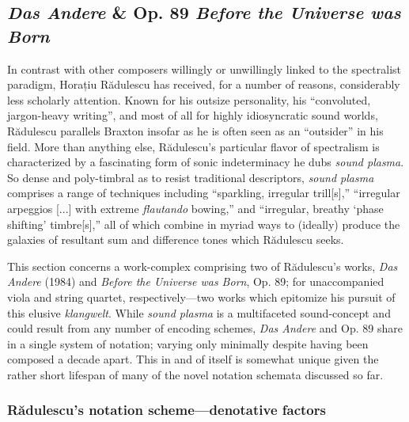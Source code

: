 \subsection{\textit{Das Andere} \& Op. 89 \textit{Before the Universe was Born}}

        In contrast with other composers willingly or unwillingly linked to the spectralist paradigm, Horațiu Rădulescu has received, for a number of reasons, considerably less scholarly attention. Known for his outsize personality, his ``convoluted, jargon-heavy writing'', and most of all for highly idiosyncratic sound worlds, Rădulescu parallels Braxton insofar as he is often seen as an ``outsider'' in his field.\autocite{Suckling_2018} More than anything else, Rădulescu's particular flavor of spectralism is characterized by a fascinating form of sonic indeterminacy he dubs \textit{sound plasma}. So dense and poly-timbral as to resist traditional descriptors, \textit{sound plasma} comprises a range of techniques including ``sparkling, irregular trill[s],'' ``irregular arpeggios [...] with extreme \textit{flautando} bowing,'' and ``irregular, breathy `phase shifting' timbre[s],'' all of which combine in myriad ways to (ideally) produce the galaxies of resultant sum and difference tones which Rădulescu seeks.\autocite{Heery_2016}
        
        This section concerns a work-complex comprising two of Rădulescu's works, \textit{Das Andere} (1984) and \textit{Before the Universe was Born}, Op. 89; for unaccompanied viola and string quartet, respectively---two works which epitomize his pursuit of this elusive \textit{klangwelt}. While \textit{sound plasma} is a multifaceted sound-concept and could result from any number of encoding schemes, \textit{Das Andere} and Op. 89 share in a single system of notation; varying only minimally despite having been composed a decade apart. This in and of itself is somewhat unique given the rather short lifespan of many of the novel notation schemata discussed so far.
    
    \subsubsection{Rădulescu's notation scheme---denotative factors}
        
